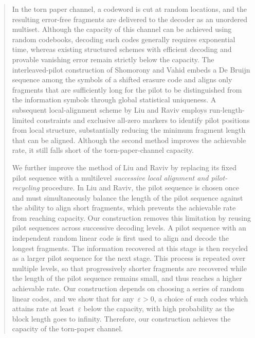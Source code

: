 \documentclass[journal,letterpaper,onecolumn,11pt]{IEEEtran}
\begin{document}


\begin{abstract}
In the torn paper channel, a codeword is cut at random locations, and the resulting error-free fragments are delivered to the decoder as an unordered multiset. 
Although the capacity of this channel can be achieved using random codebooks, decoding such codes generally requires exponential time, whereas existing structured schemes with efficient decoding and provable vanishing error remain strictly below the capacity. 
The interleaved-pilot construction of Shomorony and Vahid embeds a De Bruijn sequence among the symbols of a shifted erasure code and aligns only fragments that are sufficiently long for the pilot to be distinguished from the information symbols through global statistical uniqueness. 
A subsequent local-alignment scheme by Liu and Raviv employs run-length-limited constraints and exclusive all-zero markers to identify pilot positions from local structure, substantially reducing the minimum fragment length that can be aligned. 
Although the second method improves the achievable rate, it still falls short of the torn-paper-channel capacity.

We further improve the method of Liu and Raviv by replacing its fixed pilot sequence with a multilevel \emph{successive local alignment and pilot-recycling} procedure. 
In Liu and Raviv, the pilot sequence is chosen once and must simultaneously balance the length of the pilot sequence against the ability to align short fragments, which prevents the achievable rate from reaching capacity. 
Our construction removes this limitation by reusing pilot sequences across successive decoding levels. 
A pilot sequence with an independent random linear code is first used to align and decode the longest fragments. 
The information recovered at this stage is then recycled as a larger pilot sequence for the next stage.
This process is repeated over multiple levels, so that progressively shorter fragments are recovered while the length of the pilot sequence remains small, and thus reaches a higher achievable rate.
Our construction depends on choosing a series of random linear codes, and we show that for any~$\varepsilon>0$, a choice of such codes which attains rate at least~$\varepsilon$ below the capacity, with high probability as the block length goes to infinity.
Therefore, our construction achieves the capacity of the torn-paper channel.  

\end{abstract}
\end{document}
